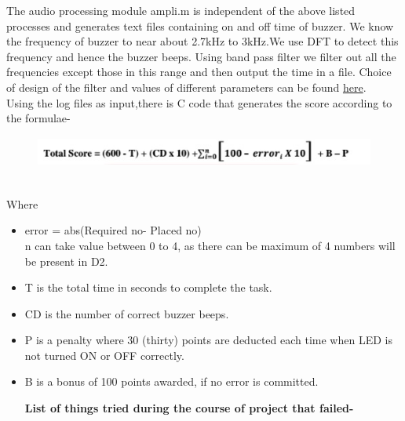\documentclass[a4paper,12pt,oneside]{book}
\begin{document}
The audio processing module ampli.m is independent of the above listed processes and generates text files containing on and off time of buzzer.
We know the frequency of buzzer to near about 2.7kHz to 3kHz.We use DFT to detect this frequency and hence the buzzer beeps. Using band pass filter we filter out all the frequencies except those in this range and then output the time in a file. Choice of design of the filter and values of different parameters can be found \href{http://in.mathworks.com/help/dsp/ref/bandpassfilter.html}{here}.\\
Using the log files as input,there is C code that generates the score according to the formulae-
\begin{figure}[h!]
		\includegraphics[width=1\linewidth, height=1cm]{score.jpg}
	\end{figure}\\
Where
\begin{itemize}
\item  error = abs(Required no- Placed no)\\ 
n can take value between 0 to 4, as there can be maximum of 4 numbers will
be present in D2.
\item T is the total time in seconds to complete the task.
\item CD is the number of correct buzzer beeps.
\item P is a penalty where 30 (thirty) points are deducted each time when LED is not turned ON or OFF correctly.
\item B is a bonus of 100 points awarded, if no error is committed.

\textbf{List of things tried during the course of project that failed-}
\end{itemize}
\end{document}
